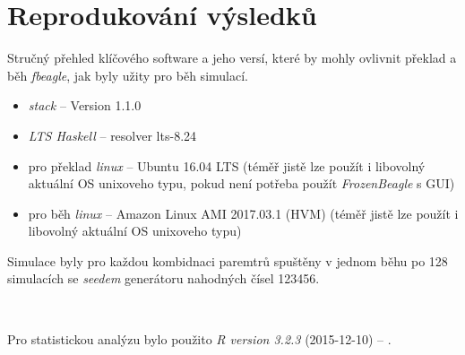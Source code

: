 \section{Reprodukování výsledků}
\label{sec:reproducing}

Stručný přehled klíčového software a jeho versí, které by mohly ovlivnit překlad a běh \textit{fbeagle},
jak byly užity pro běh simulací.

\begin{itemize}
  \item \textit{stack} -- Version 1.1.0
  \item \textit{LTS Haskell} -- resolver lts-8.24
  \item pro překlad \textit{linux} -- Ubuntu 16.04 LTS (téměř jistě lze použít i libovolný aktuální OS unixoveho typu, pokud není potřeba použít \textit{FrozenBeagle} s GUI)
  \item pro běh \textit{linux} -- Amazon Linux AMI 2017.03.1 (HVM) (téměř jistě lze použít i libovolný aktuální OS unixoveho typu)
\end{itemize}

Simulace byly pro každou kombidnaci paremtrů spuštěny v jednom běhu po 128 simulacích se
\textit{seedem} generátoru nahodných čísel 123456.

~

Pro statistickou analýzu bylo použito \textit{R version 3.2.3} (2015-12-10) -- .
